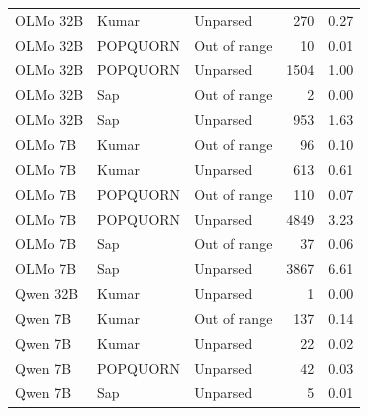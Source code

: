 \begin{table}[htbp]
\begin{tabular}{lllrl}
OLMo 32B & Kumar & Unparsed & 270 & 0.27 \\
OLMo 32B & POPQUORN & Out of range & 10 & 0.01 \\
OLMo 32B & POPQUORN & Unparsed & 1504 & 1.00 \\
OLMo 32B & Sap & Out of range & 2 & 0.00 \\
OLMo 32B & Sap & Unparsed & 953 & 1.63 \\
OLMo 7B & Kumar & Out of range & 96 & 0.10 \\
OLMo 7B & Kumar & Unparsed & 613 & 0.61 \\
OLMo 7B & POPQUORN & Out of range & 110 & 0.07 \\
OLMo 7B & POPQUORN & Unparsed & 4849 & 3.23 \\
OLMo 7B & Sap & Out of range & 37 & 0.06 \\
OLMo 7B & Sap & Unparsed & 3867 & 6.61 \\
Qwen 32B & Kumar & Unparsed & 1 & 0.00 \\
Qwen 7B & Kumar & Out of range & 137 & 0.14 \\
Qwen 7B & Kumar & Unparsed & 22 & 0.02 \\
Qwen 7B & POPQUORN & Unparsed & 42 & 0.03 \\
Qwen 7B & Sap & Unparsed & 5 & 0.01 \\
\bottomrule
\end{tabular}
\end{table}
